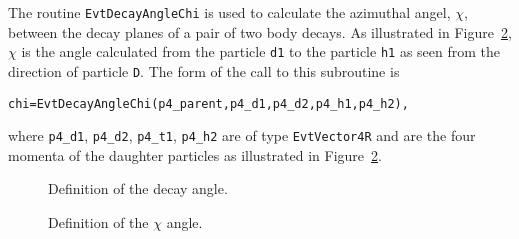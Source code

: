 The routine {\tt EvtDecayAngleChi} is used to calculate the azimuthal 
angel, $\chi$, between the decay planes of a pair of two body
decays.
As illustrated in Figure~\ref{fig:decay_angle_chi},
$\chi$ is the
angle 
calculated from the particle {\tt d1} to the particle {\tt h1} as
seen from the direction of particle {\tt D}. The form of the call to this 
subroutine is 
\begin{verbatim} 
chi=EvtDecayAngleChi(p4_parent,p4_d1,p4_d2,p4_h1,p4_h2),
\end{verbatim} 

where {\tt p4\_d1}, {\tt p4\_d2}, {\tt p4\_t1}, {\tt p4\_h2}
are of type {\tt EvtVector4R} and are the four momenta
of the daughter particles as illustrated in
Figure~\ref{fig:decay_angle_chi}.


\begin{figure}[hbtp]
\centerline{}
\caption[Definition of the decay angle.]
{
Definition of the decay angle.
}
\label{fig:decay_angle}
\end{figure}

\begin{figure}[hbtp]
\centerline{}
\caption[Definition of the $\chi$ angle.]
{
Definition of the $\chi$ angle.
}
\label{fig:decay_angle_chi}
\end{figure}










